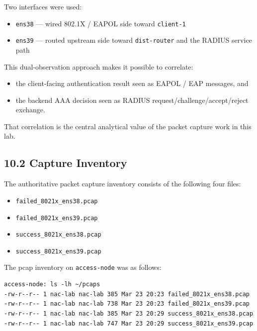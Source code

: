 \documentclass[11pt]{article}
\begin{document}
Two interfaces were used:

\begin{itemize}
    \item \texttt{ens38} --- wired 802.1X / EAPOL side toward \texttt{client-1}
    \item \texttt{ens39} --- routed upstream side toward \texttt{dist-router} and the RADIUS service path
\end{itemize}

This dual-observation approach makes it possible to correlate:
\begin{itemize}
    \item the client-facing authentication result seen as EAPOL / EAP messages, and
    \item the backend AAA decision seen as RADIUS request/challenge/accept/reject exchange.
\end{itemize}

That correlation is the central analytical value of the packet capture work in this lab.


\subsection{10.2 Capture Inventory}
\label{sec:capture-inventory}

The authoritative packet capture inventory consists of the following four files:

\begin{itemize}
    \item \texttt{failed\_8021x\_ens38.pcap}
    \item \texttt{failed\_8021x\_ens39.pcap}
    \item \texttt{success\_8021x\_ens38.pcap}
    \item \texttt{success\_8021x\_ens39.pcap}
\end{itemize}

The pcap inventory on \texttt{access-node} was as follows:

\begin{verbatim}
access-node: ls -lh ~/pcaps
-rw-r--r-- 1 nac-lab nac-lab 385 Mar 23 20:23 failed_8021x_ens38.pcap
-rw-r--r-- 1 nac-lab nac-lab 738 Mar 23 20:23 failed_8021x_ens39.pcap
-rw-r--r-- 1 nac-lab nac-lab 385 Mar 23 20:29 success_8021x_ens38.pcap
-rw-r--r-- 1 nac-lab nac-lab 747 Mar 23 20:29 success_8021x_ens39.pcap
\end{verbatim}
\end{document}
